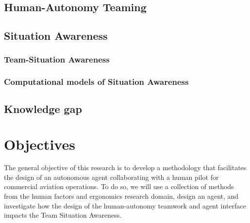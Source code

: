 \documentclass[12pt,a4paper]{article} %
\begin{document}
	\subsection{Human-Autonomy Teaming}
	\subsection{Situation Awareness}
	\subsubsection{Team-Situation Awareness}
	\subsubsection{Computational models of Situation Awareness}
	\subsection{Knowledge gap} %
	
	
	\section{Objectives} %
	The general objective of this research is to develop a methodology that facilitates the design of an autonomous agent collaborating with a human pilot for commercial aviation operations. To do so, we will use a collection of methods from the human factors and ergonomics research domain, design an agent, and investigate how the design of the human-autonomy teamwork and agent interface impacts the Team Situation Awareness.
	
\end{document}
